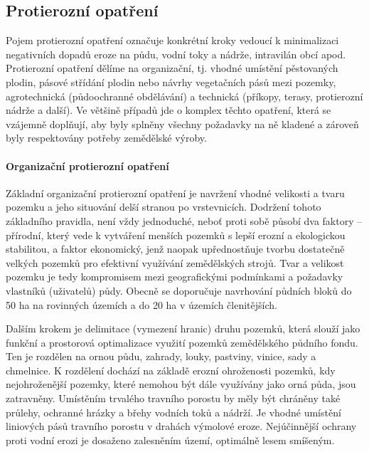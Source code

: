 \subsection{Protierozní opatření}
Pojem protierozní opatření označuje konkrétní kroky vedoucí k minimalizaci negativních dopadů eroze na půdu, vodní toky a nádrže, intravilán obcí apod. Protierozní opatření dělíme na organizační, tj. vhodné umístění pěstovaných plodin, pásové střídání plodin nebo návrhy vegetačních pásů mezi pozemky, agrotechnická (půdoochranné obdělávání) a technická (příkopy, terasy, protierozní nádrže a další). Ve většině případů jde o komplex těchto opatření, která se vzájemně doplňují, aby byly splněny všechny požadavky na ně kladené a zároveň byly respektovány potřeby zemědělské výroby.

\paragraph{Organizační protierozní opatření}
Základní organizační protierozní opatření je navržení vhodné velikosti a tvaru pozemku a jeho situování delší stranou po vrstevnicích. Dodržení tohoto základního pravidla, není vždy jednoduché, neboť proti sobě působí dva faktory – přírodní, který vede k vytváření menších pozemků s lepší erozní a ekologickou stabilitou, a faktor ekonomický, jenž naopak upřednostňuje tvorbu dostatečně velkých pozemků pro efektivní využívání zemědělských strojů. Tvar a velikost pozemku je tedy kompromisem mezi geografickými podmínkami a požadavky vlastníků (uživatelů) půdy. Obecně se doporučuje navrhování půdních bloků do 50 ha na rovinných územích a do 20 ha v územích členitějších.

Dalším krokem je delimitace (vymezení hranic) druhu pozemků, která slouží jako funkční a prostorová optimalizace využití pozemků zemědělského půdního fondu. Ten je rozdělen na ornou půdu, zahrady, louky, pastviny, vinice, sady a chmelnice. K rozdělení dochází na základě erozní ohroženosti pozemků, kdy nejohroženější pozemky, které nemohou být dále využívány jako orná půda, jsou zatravněny. Umístěním trvalého travního porostu by měly být chráněny také průlehy, ochranné hrázky a břehy vodních toků a nádrží. Je vhodné umístění liniových pásů travního porostu v drahách výmolové eroze. Nejúčinnější ochrany proti vodní erozi je dosaženo zalesněním území, optimálně lesem smíšeným.

